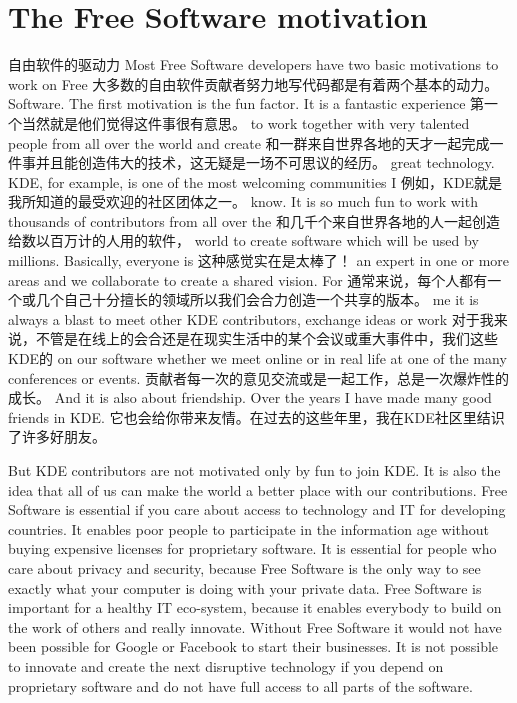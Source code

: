 \section*{The Free Software motivation}
{自由软件的驱动力}
Most Free Software developers have two basic motivations to work on Free
大多数的自由软件贡献者努力地写代码都是有着两个基本的动力。
Software. The first motivation is the fun factor. It is a fantastic experience
第一个当然就是他们觉得这件事很有意思。
to work together with very talented people from all over the world and create
和一群来自世界各地的天才一起完成一件事并且能创造伟大的技术，这无疑是一场不可思议的经历。
great technology. KDE, for example, is one of the most welcoming communities I
例如，KDE就是我所知道的最受欢迎的社区团体之一。
know. It is so much fun to work with thousands of contributors from all over the
和几千个来自世界各地的人一起创造给数以百万计的人用的软件，
world to create software which will be used by millions. Basically, everyone is
这种感觉实在是太棒了！
an expert in one or more areas and we collaborate to create a shared vision. For
通常来说，每个人都有一个或几个自己十分擅长的领域所以我们会合力创造一个共享的版本。
me it is always a blast to meet other KDE contributors, exchange ideas or work
对于我来说，不管是在线上的会合还是在现实生活中的某个会议或重大事件中，我们这些KDE的
on our software whether we meet online or in real life at one of the many conferences or events. 
贡献者每一次的意见交流或是一起工作，总是一次爆炸性的成长。
And it is also about friendship. Over the years I have made many good friends in KDE.
它也会给你带来友情。在过去的这些年里，我在KDE社区里结识了许多好朋友。

But KDE contributors are not motivated only by fun to join KDE. It is also the
idea that all of us can make the world a better place with our contributions. Free
Software is essential if you care about access to technology and IT for
developing countries. It enables poor people to participate in the information
age without buying expensive licenses for proprietary software. It is
essential for people who care about privacy and security, because Free Software
is the only way to see exactly what your computer is doing with your private
data. Free Software is important for a healthy IT eco-system, because it enables
everybody to build on the work of others and really innovate. Without Free
Software it would not have been possible for Google or Facebook to start their
businesses. It is not possible to innovate and create the next disruptive
technology if you depend on proprietary software and do not have full access to
all parts of the software.


